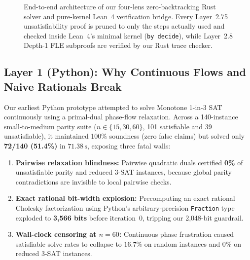 \documentclass[11pt]{article}
\begin{document}
\begin{figure}[!ht]
{%
}
\caption{End-to-end architecture of our four-lens zero-backtracking Rust solver and pure-kernel Lean~4 verification bridge. Every Layer~2.75 unsatisfiability proof is pruned to only the steps actually used and checked inside Lean~4's minimal kernel (\texttt{by decide}), while Layer~2.8 Depth-1 FLE subproofs are verified by our Rust trace checker.}
\label{fig:arch}
\end{figure}

\subsection{Layer 1 (Python): Why Continuous Flows and Naive Rationals Break}

Our earliest Python prototype attempted to solve Monotone 1-in-3 SAT continuously using a primal-dual phase-flow relaxation. Across a 140-instance small-to-medium parity suite ($n \in \{15, 30, 60\}$, 101 satisfiable and 39 unsatisfiable), it maintained 100\% soundness (zero false claims) but solved only \textbf{72/140 (51.4\%)} in $71.38\,\text{s}$, exposing three fatal walls:
\begin{enumerate}
  \item \textbf{Pairwise relaxation blindness:} Pairwise quadratic duals certified \textbf{0\%} of unsatisfiable parity and reduced 3-SAT instances, because global parity contradictions are invisible to local pairwise checks.
  \item \textbf{Exact rational bit-width explosion:} Precomputing an exact rational Cholesky factorization using Python's arbitrary-precision \texttt{Fraction} type exploded to \textbf{3,566 bits} before iteration~0, tripping our 2,048-bit guardrail.
  \item \textbf{Wall-clock censoring at $n = 60$:} Continuous phase frustration caused satisfiable solve rates to collapse to $16.7\%$ on random instances and $0\%$ on reduced 3-SAT instances.
\end{enumerate}
\end{document}
